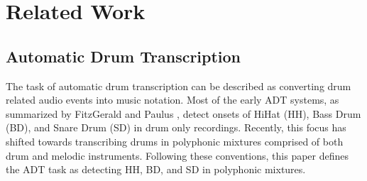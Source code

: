 \documentclass{article}
\begin{document}

%
\section{Related Work}
\label{sec:relatedwork}
%
\subsection{Automatic Drum Transcription}

The task of automatic drum transcription can be described as converting drum related audio events into music notation. 
Most of the early ADT systems, as summarized by FitzGerald and Paulus \cite{FitzGerald2006}, detect onsets of HiHat (HH), Bass Drum (BD), and Snare Drum (SD) in drum only recordings. 
Recently, this focus has shifted towards transcribing drums in polyphonic mixtures comprised of both drum and melodic instruments. Following these conventions, this paper defines the ADT task as detecting HH, BD, and SD in polyphonic mixtures. 
\end{document}
